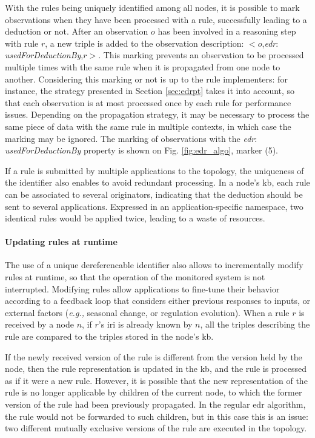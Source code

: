 \documentclass{iosart2c}
\newcommand{\namespace}[1]{\textit{#1$:$}}
\newcommand{\concept}[2]{\namespace{#1}\-\textit{#2}}
\newcommand{\triplet}[3]{$<$#1,\textit{#2},#3$>$}
\begin{document}
With the rules being uniquely identified among all nodes, it is possible to mark observations when they have been processed with a rule, successfully leading to a deduction or not.
After an observation $o$ has been involved in a reasoning step with rule $r$, a new triple is added to the observation description: \triplet{$o$}{\concept{edr}{used\-For\-Deduction\-By}}{$r$}.
This marking prevents an observation to be processed multiple times with the same rule when it is propagated from one node to another.
Considering this marking or not is up to the rule implementers: for instance, the strategy presented in Section \textsection \ref{sec:edrpt} takes it into account, so that each observation is at most processed once by each rule for performance issues.
Depending on the propagation strategy, it may be necessary to process the same piece of data with the same rule in multiple contexts, in which case the marking may be ignored.
The marking of observations with the \concept{edr}{used\-For\-Deduction\-By} property is shown on Fig. \ref{fig:edr_algo}, marker (5).

If a rule is submitted by multiple applications to the topology, the uniqueness of the identifier also enables to avoid redundant processing.
In a node's \gls{kb}, each rule can be associated to several originators, indicating that the deduction should be sent to several applications.
Expressed in an application-specific namespace, two identical rules would be applied twice, leading to a waste of resources.

\paragraph{Updating rules at runtime} 

The use of a unique dereferencable identifier also allows to incrementally modify rules at runtime, so that the operation of the monitored system is not interrupted.
Modifying rules allow applications to fine-tune their behavior according to a feedback loop that considers either previous responses to inputs, or external factors (\textit{e.g.,} seasonal change, or regulation evolution).
When a rule $r$ is received by a node $n$, if $r$'s \gls{iri} is already known by $n$, all the triples describing the rule are compared to the triples stored in the node's \gls{kb}.

If the newly received version of the rule is different from the version held by the node, then the rule representation is updated in the \gls{kb}, and the rule is processed as if it were a new rule.
However, it is possible that the new representation of the rule is no longer applicable by children of the current node, to which the former version of the rule had been previously propagated.
In the regular \gls{edr} algorithm, the rule would not be forwarded to such children, but in this case this is an issue: two different mutually exclusive versions of the rule are executed in the topology.
\end{document}
